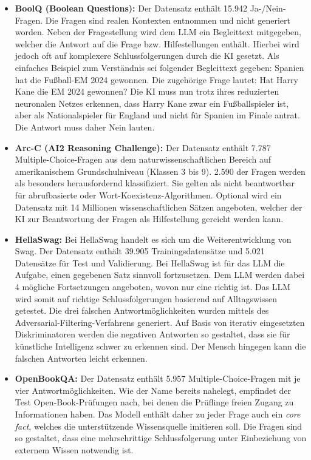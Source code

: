 \begin{itemize}
	\item \textbf{BoolQ (Boolean Questions):} Der Datensatz enthält 15.942 Ja-/Nein-Fragen. Die Fragen sind realen Kontexten entnommen und nicht generiert worden. Neben der Fragestellung wird dem LLM ein Begleittext mitgegeben, welcher die Antwort auf die Frage bzw. Hilfestellungen enthält. Hierbei wird jedoch oft auf komplexere Schlussfolgerungen durch die KI gesetzt. Als einfaches Beispiel zum Verständnis sei folgender Begleittext gegeben: Spanien hat die Fußball-EM 2024 gewonnen. Die zugehörige Frage lautet: Hat Harry Kane die EM 2024 gewonnen? Die KI muss nun trotz ihres reduzierten neuronalen Netzes erkennen, dass Harry Kane zwar ein Fußballspieler ist, aber als Nationalspieler für England und nicht für Spanien im Finale antrat. Die Antwort muss daher Nein lauten.\autocite[Vgl.][S. 1-2]{clark2019boolq}

	\item \textbf{Arc-C (AI2 Reasoning Challenge):} Der Datensatz enthält 7.787 Multiple-Choice-Fragen aus dem naturwissenschaftlichen Bereich auf amerikanischem Grundschulniveau (Klassen 3 bis 9). 2.590 der Fragen werden als besonders herausfordernd klassifiziert. Sie gelten als nicht beantwortbar für abrufbasierte oder Wort-Koexistenz-Algorithmen. Optional wird ein Datensatz mit 14 Millionen wissenschaftlichen Sätzen angeboten, welcher der KI zur Beantwortung der Fragen als Hilfestellung gereicht werden kann.\autocite[Vgl.][S. 1]{clark2019arc}

	\item \textbf{HellaSwag:} Bei HellaSwag handelt es sich um die Weiterentwicklung von Swag. Der Datensatz enthält 39.905 Trainingsdatensätze und 5.021 Datensätze für Test und Validierung. Bei HellaSwag ist für das LLM die Aufgabe, einen gegebenen Satz sinnvoll fortzusetzen. Dem LLM werden dabei 4 mögliche Fortsetzungen angeboten, wovon nur eine richtig ist. Das LLM wird somit auf richtige Schlussfolgerungen basierend auf Alltagswissen getestet. Die drei falschen Antwortmöglichkeiten wurden mittels des Adversarial-Filtering-Verfahrens generiert. Auf Basis von iterativ eingesetzten Diskriminatoren werden die negativen Antworten so gestaltet, dass sie für künstliche Intelligenz schwer zu erkennen sind. Der Mensch hingegen kann die falschen Antworten leicht erkennen.\autocite[Vgl.][S. 1-3]{zellers2019hellaswag}

	\item \textbf{OpenBookQA:} Der Datensatz enthält 5.957 Multiple-Choice-Fragen mit je vier Antwortmöglichkeiten. Wie der Name bereits nahelegt, empfindet der Test Open-Book-Prüfungen nach, bei denen die Prüflinge freien Zugang zu Informationen haben. Das Modell enthält daher zu jeder Frage auch ein \textit{core fact}, welches die unterstützende Wissensquelle imitieren soll. Die Fragen sind so gestaltet, dass eine mehrschrittige Schlussfolgerung unter Einbeziehung von externem Wissen notwendig ist.\autocite[Vgl.][S. 1-2]{mihaylov2018armor}


\end{itemize}
